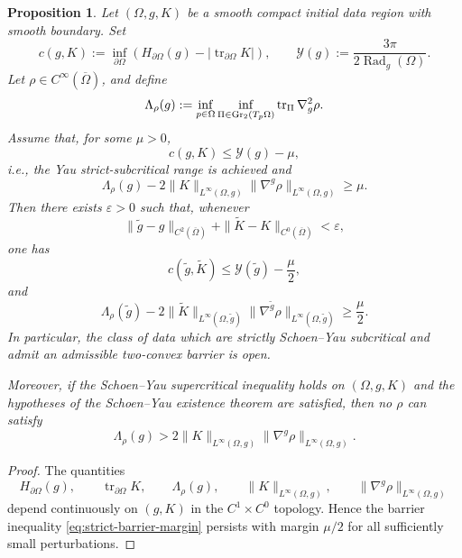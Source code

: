 \documentclass{amsart}
\newtheorem{proposition}{Proposition}[section]
\begin{document}
{\begin{proposition}
\label{subcritical-barrier-open}
Let \((\Omega,g,K)\) be a smooth compact initial data region with smooth
boundary. Set
\[
        c(g,K)
        :=
        \inf_{\partial\Omega}
        \left(
        H_{\partial\Omega}(g)
        -
        \left|
        \operatorname{tr}_{\partial\Omega}K
        \right|
        \right),
        \qquad
        \mathcal Y(g)
        :=
        \frac{3\pi}{2\operatorname{Rad}_g(\Omega)} .
\]
Let \(\rho\in C^\infty(\overline\Omega)\), and define
\[
        \Lambda_\rho(g)
        :=
        \inf_{p\in\Omega}
        \inf_{\Pi\in {\rm Gr}_2(T_p\Omega)}
        \operatorname{tr}_{\Pi}\nabla_g^2\rho .
\]
Assume that, for some \(\mu>0\),
\begin{equation}
\label{eq:strict-subcritical-margin}
        c(g,K)\le \mathcal Y(g)-\mu,
\end{equation}
i.e., the Yau strict-subcritical range is achieved
and
\begin{equation}
\label{eq:strict-barrier-margin}
        \Lambda_\rho(g)
        -
        2\|K\|_{L^\infty(\Omega,g)}
        \|\nabla^g\rho\|_{L^\infty(\Omega,g)}
        \ge \mu .
\end{equation}
Then there exists \(\varepsilon>0\) such that, whenever
\[
        \|\widetilde g-g\|_{C^2(\overline\Omega)}
        +
        \|\widetilde K-K\|_{C^0(\overline\Omega)}
        <\varepsilon,
\]
one has
\[
        c(\widetilde g,\widetilde K)
        \le
        \mathcal Y(\widetilde g)-\frac{\mu}{2},
\]
and
\[
        \Lambda_\rho(\widetilde g)
        -
        2\|\widetilde K\|_{L^\infty(\Omega,\widetilde g)}
        \|\nabla^{\widetilde g}\rho\|_{L^\infty(\Omega,\widetilde g)}
        \ge
        \frac{\mu}{2}.
\]
In particular, the class of data which are strictly Schoen--Yau
subcritical and admit an admissible two-convex barrier is open.

\noindent Moreover, if the Schoen--Yau supercritical inequality holds on
\((\Omega,g,K)\) and the hypotheses of the Schoen--Yau existence theorem
are satisfied, then no \(\rho\) can satisfy
\[
        \Lambda_\rho(g)
        >
        2\|K\|_{L^\infty(\Omega,g)}
        \|\nabla^g\rho\|_{L^\infty(\Omega,g)} .
\]
\end{proposition}

\begin{proof}
The quantities
\[
        H_{\partial\Omega}(g),
        \qquad
        \operatorname{tr}_{\partial\Omega}K,
        \qquad
        \Lambda_\rho(g),
        \qquad
        \|K\|_{L^\infty(\Omega,g)},
        \qquad
        \|\nabla^g\rho\|_{L^\infty(\Omega,g)}
\]
depend continuously on \((g,K)\) in the \(C^1\times C^0\) topology.
Hence the barrier inequality \eqref{eq:strict-barrier-margin} persists
with margin \(\mu/2\) for all sufficiently small perturbations.


\end{proof}}
\end{document}
